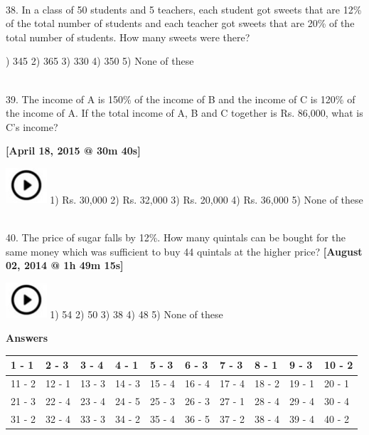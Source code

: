\documentclass{article}
\begin{document}
\noindent 

\noindent 

\noindent \\ 38. In a class of 50 students and 5 teachers, each student got sweets that are 12\% of the total number of students and each teacher got sweets that are 20\% of the total number of students. How many sweets were there?

) 345                      2) 365               3) 330               4) 350               5) None of these

\noindent \\ 39. The income of A is 150\% of the income of B and the income of C is 120\% of the income of A. If the total income of A, B and C together is Rs. 86,000, what is C's income?

\noindent \textbf{[April 18, 2015 @ 30m 40s]}

\noindent 

\noindent \includegraphics*[width=0.60in, height=0.52in]{images/image1} 1) Rs. 30,000              2) Rs. 32,000       3) Rs. 20,000       4) Rs. 36,000       5) None of these

\noindent \\ 40. The price of sugar falls by 12\%. How many quintals can be bought for the same money which was sufficient to buy 44 quintals at the higher price? \textbf{[August 02, 2014 @ 1h 49m 15s]}

\noindent \includegraphics*[width=0.60in, height=0.52in]{images/image1} 1) 54                        2) 50                 3) 38                 4) 48                 5) None of these

\noindent 

\noindent 

\noindent 

\noindent 

\noindent \textbf{Answers}

\noindent 

\noindent 

\begin{tabular}{|p{0.8in}|p{0.5in}|p{0.5in}|p{0.5in}|p{0.5in}|p{0.5in}|p{0.5in}|p{0.5in}|p{0.5in}|p{0.5in}|} \hline 
1 - 1 & 2 - 3 & 3 - 4 & 4 - 1 & 5 - 3 & 6 - 3 & 7 - 3 & 8 - 1 & 9 - 3 & 10 - 2 \\ \hline 
11 - 2 & 12 - 1 & 13 - 3 & 14 - 3 & 15 - 4 & 16 - 4 & 17 - 4 & 18 - 2 & 19 - 1 & 20 - 1 \\ \hline 
21 - 3 & 22 - 4 & 23 - 4 & 24 - 5 & 25 - 3 & 26 - 3 & 27 - 1 & 28 - 4 & 29 - 4 & 30 - 4 \\ \hline 
31 - 2 & 32 - 4 & 33 - 3 & 34 - 2 & 35 - 4 & 36 - 5 & 37 - 2 & 38 - 4 & 39 - 4 & 40 - 2 \\ \hline 
\end{tabular}
\end{document}
